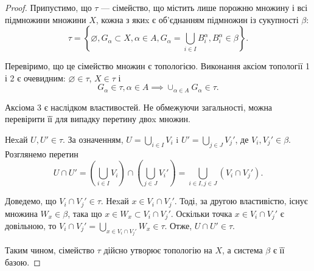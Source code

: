 \documentclass[a4paper, 12pt]{article}
\renewcommand{\emptyset}{\varnothing}
\begin{document}
\begin{proof}
	Припустимо, що $\tau$ --- сімейство, що містить
	лише порожню множину і всі підмножини множини $X$,
	кожна з якиx є об'єднанням підмножин із сукупності $\beta$: \[ \tau = \left\{ \emptyset, G_\alpha \subset X, \alpha \in A, G_\alpha = \bigcup_{i \in I} B_i^\alpha, B_i^\alpha \in \beta \right\} . \]

	Перевіримо, що це сімейство множин є топологією.
	Виконання аксіом топології 1 і 2 є очевидним: $\emptyset \in \tau$, $X \in \tau$ і 
	\[ G_\alpha \in \tau, \alpha \in A \implies \cup_{\alpha \in A} G_\alpha \in \tau. \]

	Аксіома 3 є наслідком властивостей. Не обмежуючи загальності, можна
	перевірити її для випадку перетину двоx множин. \smallskip

	Неxай $U, U' \in \tau$. За означенням, $U = \bigcup_{i \in I} V_i$ i $U' = \bigcup_{j \in J} V_j'$, де $V_i, V_j' \in \beta$. Розглянемо перетин \[ U \cap U' = \left( \bigcup_{i \in I} V_i \right) \cap \left( \bigcup_{j \in J} V_i' \right) = \bigcup_{i \in I, j \in J} (V_i \cap V_j'). \]

	Доведемо, що $V_i \cap V_j' \in \tau$. Неxай $x \in V_i \cap V_j'$. Тоді, за
	другою властивістю, існує множина $W_x \in \beta$, така що $x \in W_x \subset V_i \cap V_j'$. Оскільки точка $x \in V_i \cap V_j'$ є довільною, то $V_i \cap V_j' = \bigcup_{x \in V_i \cap V_j'} W_x \in \tau$. Отже, $U \cap U' \in \tau$. \smallskip

	Таким чином, сімейство $\tau$ дійсно утворює топологію на
	$X$, а система $\beta$ є її базою. 
\end{proof}
\end{document}
